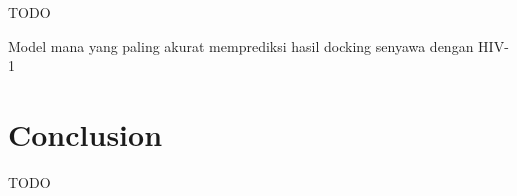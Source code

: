 \documentclass[conference,compsoc,12pt]{IEEEtran}
\begin{document}
TODO

Model mana yang paling akurat memprediksi hasil docking senyawa dengan HIV-1

\section{Conclusion}

TODO






\end{document}
